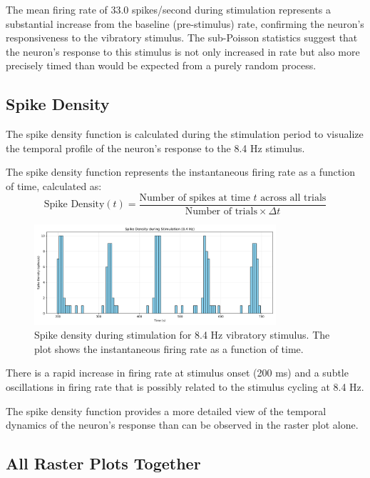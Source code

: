 \documentclass{article}
\begin{document}
The mean firing rate of 33.0 spikes/second during stimulation represents a substantial increase from the baseline (pre-stimulus) rate, confirming the neuron's responsiveness to the vibratory stimulus. The sub-Poisson statistics suggest that the neuron's response to this stimulus is not only increased in rate but also more precisely timed than would be expected from a purely random process.

\subsection{Spike Density}

The spike density function is calculated during the stimulation period to visualize the temporal profile of the neuron's response to the 8.4 Hz stimulus.

The spike density function represents the instantaneous firing rate as a function of time, calculated as:
\begin{equation}
    \text{Spike Density}(t) = \frac{\text{Number of spikes at time } t \text{ across all trials}}{\text{Number of trials} \times \Delta t}
\end{equation}


\begin{figure}[H]
\centering
\includegraphics[width=0.8\textwidth]{Fig5.png}
\caption{Spike density during stimulation for 8.4 Hz vibratory stimulus. The plot shows the instantaneous firing rate as a function of time.}
\label{fig:spike_density}
\end{figure}

There is a rapid increase in firing rate at stimulus onset (200 ms) and a subtle oscillations in firing rate that is possibly related to the stimulus cycling at 8.4 Hz.
   
The spike density function provides a more detailed view of the temporal dynamics of the neuron's response than can be observed in the raster plot alone.

\subsection{All Raster Plots Together}
\end{document}
